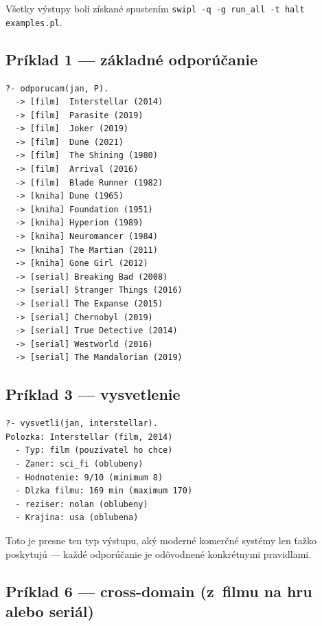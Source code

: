 \documentclass[11pt,a4paper]{article}
\begin{document}
Všetky výstupy boli získané spustením
\texttt{swipl -q -g run\_all -t halt examples.pl}.

\subsection{Príklad 1 --- základné odporúčanie}

\begin{lstlisting}[numbers=none]
?- odporucam(jan, P).
  -> [film]  Interstellar (2014)
  -> [film]  Parasite (2019)
  -> [film]  Joker (2019)
  -> [film]  Dune (2021)
  -> [film]  The Shining (1980)
  -> [film]  Arrival (2016)
  -> [film]  Blade Runner (1982)
  -> [kniha] Dune (1965)
  -> [kniha] Foundation (1951)
  -> [kniha] Hyperion (1989)
  -> [kniha] Neuromancer (1984)
  -> [kniha] The Martian (2011)
  -> [kniha] Gone Girl (2012)
  -> [serial] Breaking Bad (2008)
  -> [serial] Stranger Things (2016)
  -> [serial] The Expanse (2015)
  -> [serial] Chernobyl (2019)
  -> [serial] True Detective (2014)
  -> [serial] Westworld (2016)
  -> [serial] The Mandalorian (2019)
\end{lstlisting}

\subsection{Príklad 3 --- vysvetlenie}

\begin{lstlisting}[numbers=none]
?- vysvetli(jan, interstellar).
Polozka: Interstellar (film, 2014)
  - Typ: film (pouzivatel ho chce)
  - Zaner: sci_fi (oblubeny)
  - Hodnotenie: 9/10 (minimum 8)
  - Dlzka filmu: 169 min (maximum 170)
  - reziser: nolan (oblubeny)
  - Krajina: usa (oblubena)
\end{lstlisting}

Toto je presne ten typ výstupu, aký moderné komerčné systémy
len ťažko poskytujú --- každé odporúčanie je odôvodnené
konkrétnymi pravidlami.

\subsection{Príklad 6 --- cross-domain (z~filmu na hru alebo seriál)}
\end{document}
